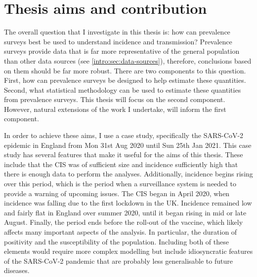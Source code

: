 \documentclass[thesis.tex]{subfiles}
\begin{document}


\section{Thesis aims and contribution}

The overall question that I investigate in this thesis is: how can prevalence surveys best be used to understand incidence and transmission?
Prevalence surveys provide data that is far more representative of the general population than other data sources (see \cref{intro:sec:data-sources}), therefore, conclusions based on them should be far more robust.
There are two components to this question.
First, how can prevalence surveys be designed to help estimate these quantities.
Second, what statistical methodology can be used to estimate these quantities from prevalence surveys.
This thesis will focus on the second component.
However, natural extensions of the work I undertake, will inform the first component.

In order to achieve these aims, I use a case study, specifically the SARS-CoV-2 epidemic in England from Mon 31st Aug 2020 until Sun 25th Jan 2021.
This case study has several features that make it useful for the aims of this thesis.
These include that the CIS was of sufficient size and incidence sufficiently high that there is enough data to perform the analyses.
Additionally, incidence begins rising over this period, which is the period when a surveillance system is needed to provide a warning of upcoming issues.
The CIS began in April 2020, when incidence was falling due to the first lockdown in the UK.
Incidence remained low and fairly flat in England over summer 2020, until it began rising in mid or late August.
Finally, the period ends before the roll-out of the vaccine, which likely affects many important aspects of the analysis.
In particular, the duration of positivity and the susceptibility of the population.
Including both of these elements would require more complex modelling but include idiosyncratic features of the SARS-CoV-2 pandemic that are probably less generalisable to future diseases.
\end{document}
